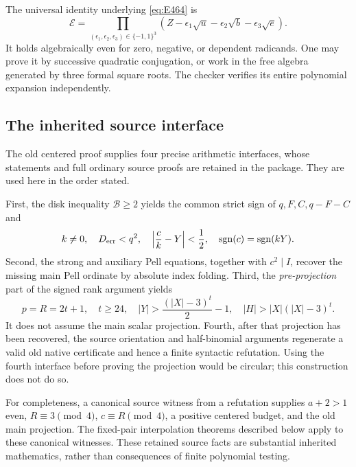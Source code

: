 The universal identity underlying \eqref{eq:E464} is
\begin{equation}
 \mathcal E=
 \prod_{(\epsilon_1,\epsilon_2,\epsilon_3)\in\{-1,1\}^3}
 (Z-\epsilon_1\sqrt u-\epsilon_2\sqrt b-\epsilon_3\sqrt e).
 \label{eq:three-norm}
\end{equation}
It holds algebraically even for zero, negative, or dependent radicands.
One may prove it by successive quadratic conjugation, or work in the
free algebra generated by three formal square roots. The checker
verifies its entire polynomial expansion independently.

\subsection{The inherited source interface}

The old centered proof supplies four precise arithmetic interfaces,
whose statements and full ordinary source proofs are retained in the
package. They are used here in the order stated.

First, the disk inequality $\mathcal B\ge2$ yields the common strict
sign of $q,F,C,q-F-C$ and
\begin{equation}
 k\ne0,\quad D_{\rm err}<q^2,\quad
 \left|\frac{c}{k}-Y\right|<\frac12,\quad
 \operatorname{sgn}(c)=\operatorname{sgn}(kY).
 \label{eq:centered-strip}
\end{equation}
Second, the strong and auxiliary Pell equations, together with
$c^2\mid I$, recover the missing main Pell ordinate by absolute index
folding. Third, the \emph{pre-projection} part of the signed rank
argument yields
\begin{equation}
 p=R=2t+1,\quad t\ge24,\quad
 |Y|>\frac{(|X|-3)^t}{2}-1,\quad
 |H|>|X|(|X|-3)^t.
 \label{eq:rank-bound}
\end{equation}
It does not assume the main scalar projection. Fourth, after that
projection has been recovered, the source orientation and half-binomial
arguments regenerate a valid old native certificate and hence a finite
syntactic refutation. Using the fourth interface before proving the
projection would be circular; this construction does not do so.

For completeness, a canonical source witness from a refutation supplies
$a+2>1$ even, $R\equiv3\pmod4$, $c\equiv R\pmod4$, a positive
centered budget, and the old main projection. The fixed-pair interpolation
theorems described below apply to these canonical witnesses. These
retained source facts are substantial inherited mathematics, rather
than consequences of finite polynomial testing.

